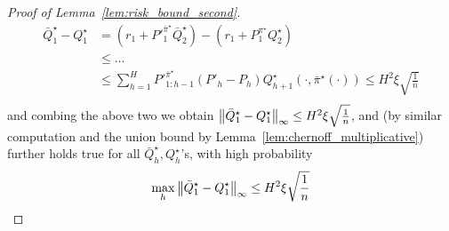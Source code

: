 \begin{proof}[Proof of Lemma~\ref{lem:risk_bound_second}]
\begin{align*}
\bar{Q}_1^\star-Q^\star_1&=\left(r_1+P'^{\bar{\pi}^\star}_1\bar{Q}_2^\star\right)-\left(r_1+P^{{\pi}^\star}_1{Q}_2^\star\right)\\
&\leq \ldots\\
&\leq \sum_{h=1}^H P'^{\bar{\pi}^\star}_{1:h-1}\left(P'_h-P_h\right){Q}_{h+1}^\star(\cdot,\bar{\pi}^\star(\cdot))\leq H^2\xi\sqrt{\frac{1}{n}}\\
\end{align*}
and combing the above two we obtain $\left\lVert\bar{Q}_1^\star-Q_1^\star\right\rVert_\infty\leq H^2\xi\sqrt{\frac{1}{n}}$, and (by similar computation and the union bound by Lemma~\ref{lem:chernoff_multiplicative}) further holds true for all $\bar{Q}^\star_h,Q^\star_h$'s, with high probability
\begin{equation}\label{eqn:crude_diff}
\max_{h}\left\lVert\bar{Q}_1^\star-Q_1^\star\right\rVert_\infty\leq H^2\xi\sqrt{\frac{1}{n}}
\end{equation}


\end{proof}
